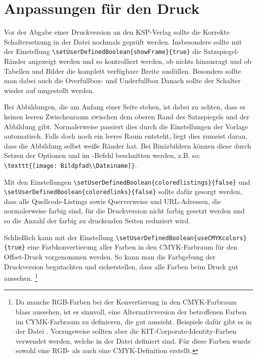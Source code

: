 \section[Anpassungen für den Druck]{Anpassungen für den Druck}%
%
\label{sec:Druckanpassungen}
%
Vor der Abgabe einer Druckversion an den KSP-Verlag sollte die Korrekte Schaltersetzung in der Datei  nochmals geprüft werden.
Insbesondere sollte mit der Einstellung
\lstinline|\setUserDefinedBoolean{showFrame}{true}|
die Satzspiegel-Ränder angezeigt werden und so kontrolliert werden,
ob nichts hinausragt und ob Tabellen und Bilder die komplett verfügbare Breite ausfüllen.
Besonders sollte man dabei auch die Overfullbox- und Underfullbox 
Danach sollte der Schalter wieder auf  umgestellt werden.

Bei Abbildungen, die am Anfang einer Seite stehen, ist dabei zu achten,
dass es keinen leeren Zwischenraum zwischen dem oberen Rand des Satzspiegels und der Abbildung gibt.
Normalerweise passiert dies durch die Einstellungen der Vorlage automatisch.
Falls doch noch ein leeres Raum entsteht, liegt dies zumeist daran, dass die Abbildung selbst weiße Ränder hat.
Bei Binärbildern können diese durch Setzen der Optionen
 und 
im -Befehl beschnitten werden, z.B. so:
\lstinline|\texttt{[image: Bildpfad\\Dateiname]}|.

Mit den Einstellungen 
\lstinline|\setUserDefinedBoolean{coloredlistings}{false}| und 
\lstinline|\setUserDefinedBoolean{coloredlinks}{false}|
sollte dafür gesorgt werden, dass alle Quellcode-Listings sowie Querverweise und URL-Adressen,
die normalerweise farbig sind, für die Druckversion nicht farbig gesetzt werden
und so die Anzahl der farbig zu druckenden Seiten reduziert wird.

Schließlich kann mit der Einstellung
\lstinline|\setUserDefinedBoolean{useCMYKcolors}{true}|
eine Farbkonvertierung aller Farben in den CMYK-Farbraum für den Offset-Druck vorgenommen werden.
So kann man die Farbgebung der Druckversion begutachten und sicherstellen, dass alle Farben beim Druck gut aussehen.%
\footnote{Da manche RGB-Farben bei der Konvertierung in den CMYK-Farbraum blass aussehen,
ist es sinnvoll, eine Alternativversion der betroffenen Farben im CYMK-Farbraum zu definieren,
die gut aussieht.
Beispiele dafür gibt es in der Datei .
Vorzugsweise sollten aber die KIT-Corporate-Identity-Farben verwendet werden,
welche in der Datei  definiert sind.
Für diese Farben wurde sowohl eine RGB- als auch eine CMYK-Definition erstellt.}